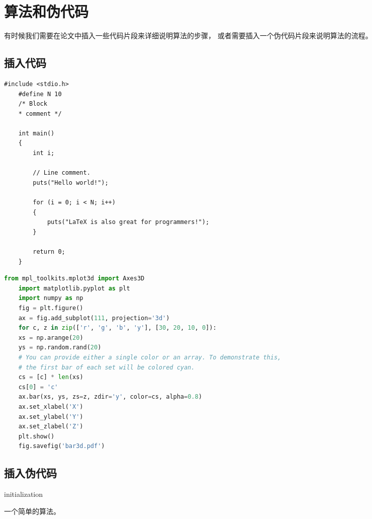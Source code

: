 \section{算法和伪代码}
有时候我们需要在论文中插入一些代码片段来详细说明算法的步骤，
或者需要插入一个伪代码片段来说明算法的流程。

\subsection{插入代码}
\lstset{escapechar=@,style=customc}

\begin{lstlisting}[caption={一段C语言程序。},captionpos=b]
	#include <stdio.h>
	#define N 10
	/* Block
	* comment */
	
	int main()
	{
		int i;
		
		// Line comment.
		puts("Hello world!");
		
		for (i = 0; i < N; i++)
		{
			puts("LaTeX is also great for programmers!");
		}
		
		return 0;
	}
\end{lstlisting}

\begin{lstlisting}[caption={一段Python语言程序。},captionpos=b,language=Python]
	from mpl_toolkits.mplot3d import Axes3D
	import matplotlib.pyplot as plt
	import numpy as np
	fig = plt.figure()
	ax = fig.add_subplot(111, projection='3d')
	for c, z in zip(['r', 'g', 'b', 'y'], [30, 20, 10, 0]):
	xs = np.arange(20)
	ys = np.random.rand(20)
	# You can provide either a single color or an array. To demonstrate this,
	# the first bar of each set will be colored cyan.
	cs = [c] * len(xs)
	cs[0] = 'c'
	ax.bar(xs, ys, zs=z, zdir='y', color=cs, alpha=0.8)
	ax.set_xlabel('X')
	ax.set_ylabel('Y')
	ax.set_zlabel('Z')
	plt.show()
	fig.savefig('bar3d.pdf')
\end{lstlisting}

\subsection{插入伪代码}
\begin{algorithm}[H]
	\SetAlgoLined
	initialization\;
	\caption{一个简单的算法。}
\end{algorithm}